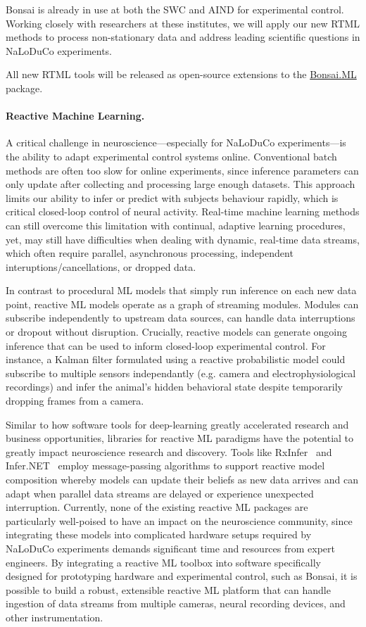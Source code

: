 Bonsai is already in use at both the SWC and AIND for experimental control. Working closely with researchers at these institutes, we will apply our new RTML methods to process non-stationary data and address leading scientific questions in NaLoDuCo experiments.

All new RTML tools will be released as open-source extensions to the \href{https://bonsai-rx.org/machinelearning/}{Bonsai.ML} package.

\paragraph{Reactive Machine Learning.}

A critical challenge in neuroscience—especially for NaLoDuCo experiments—is the ability to adapt experimental control systems online. Conventional batch methods are often too slow for online experiments, since inference parameters can only update after collecting and processing large enough datasets. This approach limits our ability to infer or predict with subjects behaviour rapidly, which is critical closed-loop control of neural activity. Real-time machine learning methods can still overcome this limitation with continual, adaptive learning procedures, yet, may still have difficulties when dealing with dynamic, real-time data streams, which often require parallel, asynchronous processing, independent interuptions/cancellations, or dropped data.

In contrast to procedural ML models that simply run inference on each new data point, reactive ML models operate as a graph of streaming modules. Modules can subscribe independently to upstream data sources, can handle data interruptions or dropout without disruption. Crucially, reactive models can generate ongoing inference that can be used to inform closed-loop experimental control. For instance, a Kalman filter formulated using a reactive probabilistic model could subscribe to multiple sensors independantly (e.g. camera and electrophysiological recordings) and infer the animal’s hidden behavioral state despite temporarily dropping frames from a camera.

Similar to how software tools for deep-learning greatly accelerated research and business opportunities, libraries for reactive ML paradigms have the potential to greatly impact neuroscience research and discovery. Tools like RxInfer~\citep{RxInfer} and Infer.NET~\citep{Infer.NET} employ message-passing algorithms to support reactive model composition whereby models can update their beliefs as new data arrives and can adapt when parallel data streams are delayed or experience unexpected interruption. Currently, none of the existing reactive ML packages are particularly well-poised to have an impact on the neuroscience community, since integrating these models into complicated hardware setups required by NaLoDuCo experiments demands significant time and resources from expert engineers. By integrating a reactive ML toolbox into software specifically designed for prototyping hardware and experimental control, such as Bonsai, it is possible to build a robust, extensible reactive ML platform that can handle ingestion of data streams from multiple cameras, neural recording devices, and other instrumentation. 

